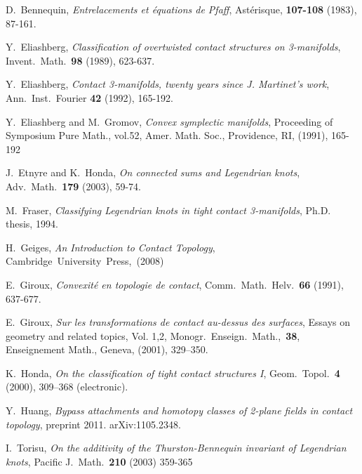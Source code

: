 \documentclass[12pt]{amsart}
\theoremstyle{remark}
\begin{document}
\begin{thebibliography}{}

 D.\ Bennequin, \textit{Entrelacements et \'equations de Pfaff}, Ast\'erisque, {\bf 107-108} (1983), 87-161.

 Y.\ Eliashberg, \textit{Classification of overtwisted contact structures on 3-manifolds}, Invent.\ Math.\ {\bf 98} (1989), 623-637.

 Y.\ Eliashberg, \textit{Contact 3-manifolds, twenty years since J. Martinet's work}, Ann.\ Inst.\ Fourier {\bf 42} (1992), 165-192.

 Y.\ Eliashberg and M.\ Gromov, \textit{Convex symplectic manifolds}, Proceeding of Symposium Pure Math., vol.52, Amer. Math. Soc., Providence, RI, (1991), 165-192

 J.\ Etnyre and K.\ Honda, \textit{On connected sums and Legendrian knots}, Adv.\ Math.\ {\bf 179} (2003), 59-74.

 M.\ Fraser, \textit{Classifying Legendrian knots in tight contact 3-manifolds}, Ph.D. thesis, 1994.

 H.\ Geiges, \textit{An Introduction to Contact Topology}, Cambridge\ University\ Press,\ (2008)

 E.\ Giroux, \textit{Convexit\'e en topologie de contact}, Comm.\ Math.\ Helv.\ {\bf 66} (1991), 637-677.

 E.\ Giroux, \textit{Sur les transformations de contact au-dessus des surfaces}, Essays on geometry and related topics, Vol. 1,2, Monogr.\ Enseign.\ Math.,\ {\bf 38}, Enseignement Math., Geneva, (2001), 329--350.

 K.\ Honda, \textit{On the classification of tight contact structures I}, Geom.\ Topol.\ {\bf 4} (2000), 309--368 (electronic).

 Y.\ Huang, \textit{Bypass attachments and homotopy classes of 2-plane fields in contact topology}, preprint 2011. arXiv:1105.2348.

 I.\ Torisu, \textit{On the additivity of the Thurston-Bennequin invariant of Legendrian knots}, Pacific J.\ Math.\ {\bf 210} (2003) 359-365

\end{thebibliography}
\end{document}
